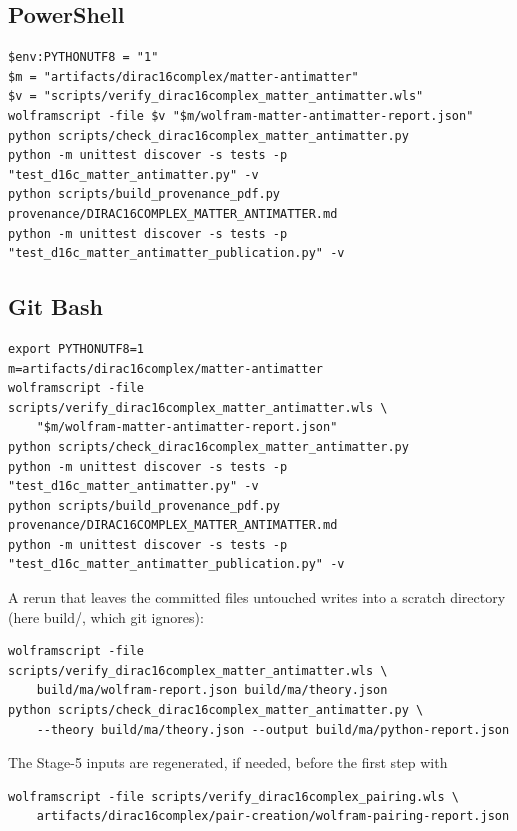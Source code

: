 \documentclass[11pt]{article}
\begin{document}
\subsection{PowerShell}

\begin{Verbatim}[fontsize=\small]
$env:PYTHONUTF8 = "1"
$m = "artifacts/dirac16complex/matter-antimatter"
$v = "scripts/verify_dirac16complex_matter_antimatter.wls"
wolframscript -file $v "$m/wolfram-matter-antimatter-report.json"
python scripts/check_dirac16complex_matter_antimatter.py
python -m unittest discover -s tests -p "test_d16c_matter_antimatter.py" -v
python scripts/build_provenance_pdf.py provenance/DIRAC16COMPLEX_MATTER_ANTIMATTER.md
python -m unittest discover -s tests -p "test_d16c_matter_antimatter_publication.py" -v
\end{Verbatim}

\subsection{Git Bash}

\begin{Verbatim}[fontsize=\small]
export PYTHONUTF8=1
m=artifacts/dirac16complex/matter-antimatter
wolframscript -file scripts/verify_dirac16complex_matter_antimatter.wls \
    "$m/wolfram-matter-antimatter-report.json"
python scripts/check_dirac16complex_matter_antimatter.py
python -m unittest discover -s tests -p "test_d16c_matter_antimatter.py" -v
python scripts/build_provenance_pdf.py provenance/DIRAC16COMPLEX_MATTER_ANTIMATTER.md
python -m unittest discover -s tests -p "test_d16c_matter_antimatter_publication.py" -v
\end{Verbatim}

A rerun that leaves the committed files untouched writes into a scratch directory (here build/, which git ignores):

\begin{Verbatim}[fontsize=\small]
wolframscript -file scripts/verify_dirac16complex_matter_antimatter.wls \
    build/ma/wolfram-report.json build/ma/theory.json
python scripts/check_dirac16complex_matter_antimatter.py \
    --theory build/ma/theory.json --output build/ma/python-report.json
\end{Verbatim}

The Stage-5 inputs are regenerated, if needed, before the first step with

\begin{Verbatim}[fontsize=\small]
wolframscript -file scripts/verify_dirac16complex_pairing.wls \
    artifacts/dirac16complex/pair-creation/wolfram-pairing-report.json
\end{Verbatim}
\end{document}
